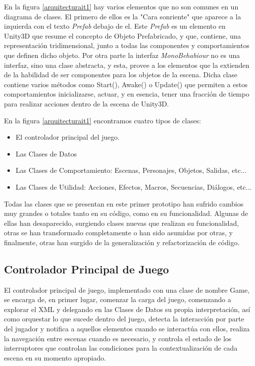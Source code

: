 En la figura \ref{arquitecturait1} hay varios elementos que no son comunes en un diagrama de clases. El primero de ellos es la "Cara sonriente" que aparece a la izquierda con el texto \textit{Prefab} debajo de el. Este \textit{Prefab} es un elemento en Unity3D que resume el concepto de Objeto Prefabricado, y que, contiene, una representación tridimensional, junto a todas las componentes y comportamientos que definen dicho objeto. Por otra parte la interfaz \textit{MonoBehabiour} no es una interfaz, sino una clase abstracta, y esta, provee a los elementos que la extienden de la habilidad de ser componentes para los objetos de la escena. Dicha clase contiene varios métodos como Start(), Awake() o Update() que permiten a estos comportamientos inicializarse, actuar, y en esencia, tener una fracción de tiempo para realizar acciones dentro de la escena de Unity3D.

En la figura \ref{arquitecturait1} encontramos cuatro tipos de clases:

\begin{itemize}
	\item El controlador principal del juego.
	\item Las Clases de Datos
	\item Las Clases de Comportamiento: Escenas, Personajes, Objetos, Salidas, etc...
	\item Las Clases de Utilidad: Acciones, Efectos, Macros, Secuencias, Diálogos, etc...
\end{itemize}

Todas las clases que se presentan en este primer prototipo han sufrido cambios muy grandes o totales tanto en su código, como en su funcionalidad. Algunas de ellas han desaparecido, surgiendo clases nuevas que realizan su funcionalidad, otras se han transformado completamente o han sido asumidas por otras, y finalmente, otras han surgido de la generalización y refactorización de código.

\subsection{Controlador Principal de Juego}

El controlador principal de juego, implementado con una clase de nombre Game, se encarga de, en primer lugar, comenzar la carga del juego, comenzando a explorar el XML y delegando en las Clases de Datos su propia interpretación, así como orquestar lo que sucede dentro del juego, detecta la interacción por parte del jugador y notifica a aquellos elementos cuando se interactúa con ellos, realiza la navegación entre escenas cuando es necesario, y controla el estado de los interruptores que controlan las condiciones para la contextualización de cada escena en su momento apropiado.


